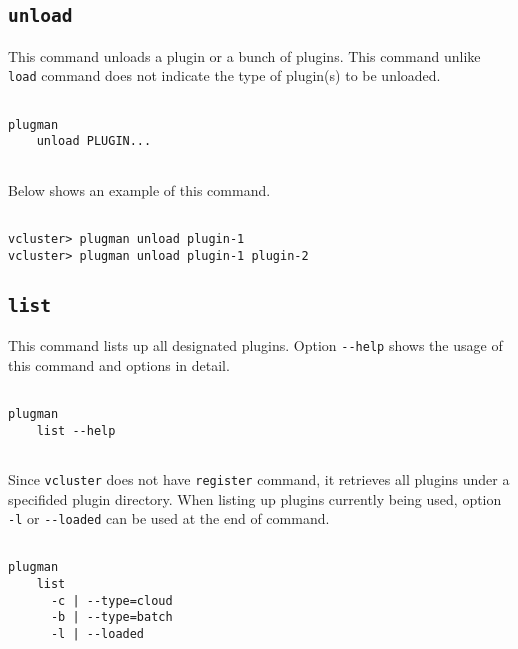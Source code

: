 \documentclass[11pt]{article}
\def \ttt{\texttt}
\def \vb{\verb}
\begin{document}
\subsection{\ttt{unload}}
This command unloads a plugin or a bunch of plugins. This command unlike \vb+load+ command does not indicate the type of plugin(s) to be unloaded.

\begin{Verbatim}[fontfamily=courier, fontsize = \small, obeytabs
=true, tabsize=4, frame=lines]

plugman 
    unload PLUGIN...
      
\end{Verbatim}

Below shows an example of this command.

\begin{Verbatim}[fontfamily=courier, fontsize = \small, obeytabs
=true, tabsize=4, frame=lines]

vcluster> plugman unload plugin-1
vcluster> plugman unload plugin-1 plugin-2

\end{Verbatim}




\subsection{\ttt{list}}
This command lists up all designated plugins. Option \vb+--help+ shows the usage of this command and options in detail.

\begin{Verbatim}[fontfamily=courier, fontsize = \small, obeytabs
=true, tabsize=4, frame=lines]

plugman 
    list --help
      
\end{Verbatim}


Since \vb+vcluster+ does not have \vb+register+ command, it retrieves all plugins under a specifided plugin directory. When listing up plugins currently being used, option \vb+-l+ or \vb+--loaded+ can be used at the end of command.

\begin{Verbatim}[fontfamily=courier, fontsize = \small, obeytabs
=true, tabsize=4, frame=lines]

plugman 
    list
      -c | --type=cloud 
      -b | --type=batch
      -l | --loaded
      
\end{Verbatim}
\end{document}
